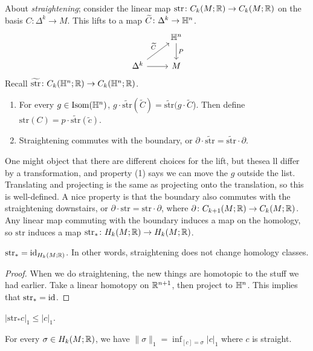 About \emph{straightening}; consider the linear map $\mathrm{str} \colon C_k(M; \mathbb{R}) \to C_k(M; \mathbb{R})$ on the basis $C \colon \Delta ^k \to M$. This lifts to a map $\widetilde C \colon \Delta ^k \to \mathbb{H}^n $.
\[
\begin{tikzcd}
                                              & \H^n \arrow[d, "P"] \\
\Delta^k \arrow[ru, "\widetilde C"] \arrow[r] & M                  
\end{tikzcd}
\] 
Recall $\widetilde {\mathrm{str}} \colon C_k(\mathbb{H}^n ;\mathbb{R}) \to C_k(\mathbb{H}^n ;\mathbb{R})$.
\begin{enumerate}[label=(\arabic*)]
\setlength\itemsep{-.2em}
    \item For every $g \in \mathrm{Isom}(\mathbb{H}^n )$, $g\cdot  \widetilde{\mathrm{str}}(\widetilde C)= \widetilde {\mathrm{str}} (g \cdot \widetilde C$). Then define $\mathrm{str}(C)=p \cdot \widetilde {\mathrm{str}} (\widetilde c)$.
    \item Straightening commutes with the boundary, or $\partial \cdot \widetilde{\mathrm{str}}=\widetilde{\mathrm{str}} \cdot \partial $.
\end{enumerate}
One might object that there are different choices for the lift, but thesea ll differ by a transformation, and property (1) says we can move the $g$ outside the list. Translating and projecting is the same as projecting onto the translation, so this is well-defined. A nice property is that the boundary also commutes with the straightening downstairs, or $\partial \cdot \mathrm{str}=\mathrm{str}\cdot \partial $, where $\partial \colon C_{k+1}(M; \mathbb{R}) \to C_k(M;\mathbb{R})$.
Any linear map commuting with the boundary induces a map on the homology, so $\mathrm{str}$ induces a map $\mathrm{str}_* \colon H_k(M;\mathbb{R}) \to H_k(M;\mathbb{R})$.
\begin{lemma}
    $\mathrm{str}_* =\operatorname{id}_{H_k(M;\mathbb{R})}$.
In other words, straightening does not change homology classes.
\end{lemma}
\begin{proof}
    When we do straightening, the new things are homotopic to the stuff we had earlier. Take a linear homotopy on $\mathbb{R}^{n+1}$, then project to $\mathbb{H}^n $. This implies that $\mathrm{str}_*=\operatorname{id}$.
\end{proof}
\begin{lemma}
    $| \mathrm{str}_* c|_1 \leq |c|_1$.
\end{lemma}
\begin{cor}\label{str} 
    For every $\sigma\in H_k(M; \mathbb{R}) $, we have $\|\sigma\|_1=\inf _{[c]=\sigma}|c|_1$ where $c$ is straight.
\end{cor}
